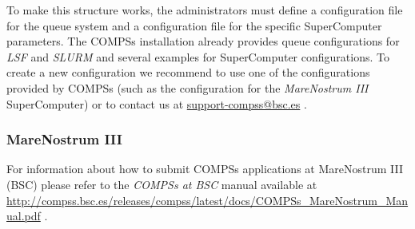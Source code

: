 To make this structure works, the administrators must define a configuration file for the queue system and a configuration file
for the specific SuperComputer parameters. The COMPSs installation already provides queue configurations for \textit{LSF} and 
\textit{SLURM} and several examples for SuperComputer configurations. 
To create a new configuration we recommend to use one of the configurations provided by COMPSs (such as the configuration for the
\textit{MareNostrum III} SuperComputer) or to contact us at \url{support-compss@bsc.es} .

\subsubsection{MareNostrum III}

For information about how to submit COMPSs applications at MareNostrum III (BSC) please refer to the \textit{COMPSs at BSC} manual 
available at \url{http://compss.bsc.es/releases/compss/latest/docs/COMPSs_MareNostrum_Manual.pdf} .
